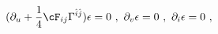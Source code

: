 \begin{equation}
 (\partial_u + \frac{1}{4} \cF_{ij} \Gamma^{\hat{i} \hat{j}}) \epsilon =0 ~,~
 \partial_v \epsilon =0 ~,~ \partial_i \epsilon = 0 ~, 
\label{killing1}
\end{equation}

